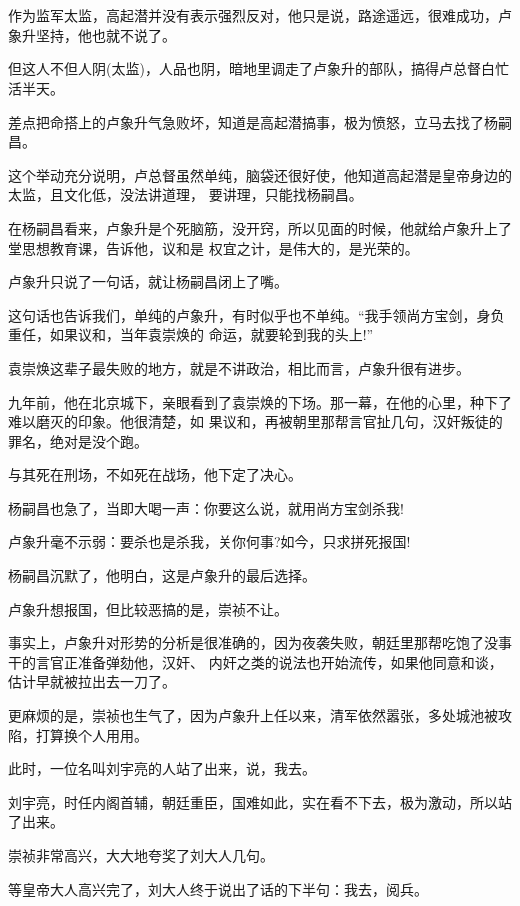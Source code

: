 \documentclass[11pt,a4paper,onecolumn]{article}
\begin{document}
\section[\thesection]{}

作为监军太监，高起潜并没有表示强烈反对，他只是说，路途遥远，很难成功，卢象升坚持，他也就不说了。

但这人不但人阴(太监)，人品也阴，暗地里调走了卢象升的部队，搞得卢总督白忙活半天。

差点把命搭上的卢象升气急败坏，知道是高起潜搞事，极为愤怒，立马去找了杨嗣昌。

这个举动充分说明，卢总督虽然单纯，脑袋还很好使，他知道高起潜是皇帝身边的太监，且文化低，没法讲道理，
要讲理，只能找杨嗣昌。

在杨嗣昌看来，卢象升是个死脑筋，没开窍，所以见面的时候，他就给卢象升上了堂思想教育课，告诉他，议和是
权宜之计，是伟大的，是光荣的。

卢象升只说了一句话，就让杨嗣昌闭上了嘴。

这句话也告诉我们，单纯的卢象升，有时似乎也不单纯。``我手领尚方宝剑，身负重任，如果议和，当年袁崇焕的
命运，就要轮到我的头上!''

袁崇焕这辈子最失败的地方，就是不讲政治，相比而言，卢象升很有进步。

九年前，他在北京城下，亲眼看到了袁崇焕的下场。那一幕，在他的心里，种下了难以磨灭的印象。他很清楚，如
果议和，再被朝里那帮言官扯几句，汉奸叛徒的罪名，绝对是没个跑。

与其死在刑场，不如死在战场，他下定了决心。

杨嗣昌也急了，当即大喝一声：你要这么说，就用尚方宝剑杀我!

卢象升毫不示弱：要杀也是杀我，关你何事?如今，只求拼死报国!

杨嗣昌沉默了，他明白，这是卢象升的最后选择。

卢象升想报国，但比较恶搞的是，崇祯不让。

事实上，卢象升对形势的分析是很准确的，因为夜袭失败，朝廷里那帮吃饱了没事干的言官正准备弹劾他，汉奸、
内奸之类的说法也开始流传，如果他同意和谈，估计早就被拉出去一刀了。

更麻烦的是，崇祯也生气了，因为卢象升上任以来，清军依然嚣张，多处城池被攻陷，打算换个人用用。

此时，一位名叫刘宇亮的人站了出来，说，我去。

刘宇亮，时任内阁首辅，朝廷重臣，国难如此，实在看不下去，极为激动，所以站了出来。

崇祯非常高兴，大大地夸奖了刘大人几句。

等皇帝大人高兴完了，刘大人终于说出了话的下半句：我去，阅兵。
\end{document}
